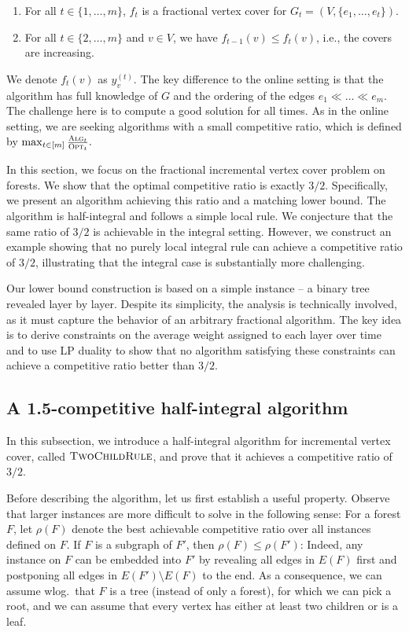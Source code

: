 \documentclass[a4paper,USenglish,cleveref,autoref,thm-restate,pdfa]{lipics-v2021}
\let\leq\leqslant
\newcommand{\alg}{\textsc{Alg}\xspace}
\newcommand{\opt}{\textsc{Opt}\xspace}
\newcommand{\compratio}{\rho}
\begin{document}
\begin{enumerate}[(1)]
  \item For all $t \in \{1, \ldots, m\}$, $f_t$ is a fractional vertex cover for $G_t=(V,\{e_1, \dots, e_t\})$.\label{cond:frac_vertex_cover}
  \item For all $t \in \{2, \ldots, m\}$ and $v\in V$, we have $f_{t-1}(v) \leq f_{t}(v)$, i.e., the covers are increasing.\label{cond:increasing}
\end{enumerate}

We denote $f_t(v)$ as $y_v^{(t)}$.
The key difference to the online setting is that the algorithm has full knowledge of $G$ and the ordering of the edges $e_1 \ll \dots \ll e_m$.
The challenge here is to compute a good solution for all times.
As in the online setting, we are seeking algorithms with a small competitive ratio, which is defined by 
$
\max_{t \in [m]} \frac{\alg_t}{\opt_t}.
$

In this section, we focus on the fractional incremental vertex cover problem on forests. We show that the optimal competitive ratio is exactly $3/2$. Specifically, we present an algorithm achieving this ratio and a matching lower bound. The algorithm is half-integral and follows a simple local rule.
We conjecture that the same ratio of $3/2$ is achievable in the integral setting.
However, we construct an example showing that no purely local integral rule can achieve a competitive ratio of $3/2$, illustrating that the integral case is substantially more challenging.

Our lower bound construction is based on a simple instance -- a binary tree revealed layer by layer. Despite its simplicity, the analysis is technically involved, as it must capture the behavior of an arbitrary fractional algorithm. The key idea is to derive constraints on the average weight assigned to each layer over time and to use LP duality to show that no algorithm satisfying these constraints can achieve a competitive ratio better than $3/2$.

\subsection{A 1.5-competitive half-integral algorithm}

In this subsection, we introduce a half-integral algorithm for incremental vertex cover, called $\textsc{TwoChildRule}$, and prove that it achieves a competitive ratio of $3/2$.

Before describing the algorithm, let us first establish a useful property.
Observe that larger instances are more difficult to solve in the following sense: 
For a forest $F$, let $\compratio(F)$ denote the best achievable competitive ratio over all instances defined on $F$. If $F$ is a subgraph of $F'$, then $\compratio(F) \leq \compratio(F')$: Indeed, any instance on $F$ can be embedded into $F'$ by revealing all edges in $E(F)$ first and postponing all edges in $E(F') \setminus E(F)$ to the end.
As a consequence, we can assume wlog.~that $F$ is a tree (instead of only a forest),
for which we can pick a root, and we can assume that every vertex has either at least two children or is a leaf.
\end{document}
